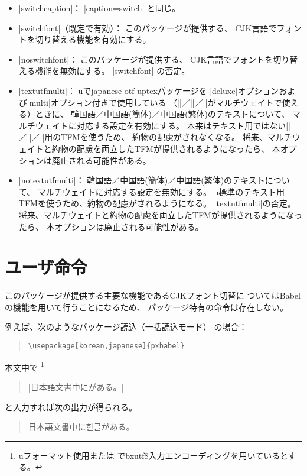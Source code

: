 \documentclass[a4paper,uplatex]{jsarticle}
\newcommand{\Pkg}[1]{\textsf{#1}}
\newcommand{\Means}{：\quad\inhibitglue}
\providecommand{\upTeX}{u\pTeX}
\providecommand{\upLaTeX}{u\pLaTeX}
\newcommand{\Kor}[1]{{\kanjishape{ko}\selectfont #1}}
\begin{document}
\begin{itemize}
\item |switchcaption|\Means
|caption=switch| と同じ。

\item |switchfont|（既定で有効）\Means
このパッケージが提供する、
CJK言語でフォントを切り替える機能を有効にする。

\item |noswitchfont|\Means
このパッケージが提供する、
CJK言語でフォントを切り替える機能を無効にする。
|switchfont| の否定。

\item |textutfmulti|\Means
\upTeX で\Pkg{japanese-otf-uptex}パッケージを
|deluxe|オプションおよび|multi|オプション付きで使用している
（|\UTFK|／|\UTFC|／|\UTFT|がマルチウェイトで使える）ときに、
韓国語／中国語(簡体)／中国語(繁体)のテキストについて、
マルチウェイトに対応する設定を有効にする。
本来はテキスト用ではない|\UTFK|／|\UTFC|／|\UTFT|用のTFMを使うため、
約物の配慮がされなくなる。
将来、マルチウェイトと約物の配慮を両立したTFMが提供されるようになったら、
本オプションは廃止される可能性がある。

\item |notextutfmulti|\Means
韓国語／中国語(簡体)／中国語(繁体)のテキストについて、
マルチウェイトに対応する設定を無効にする。
\upTeX 標準のテキスト用TFMを使うため、約物の配慮がされるようになる。
|textutfmulti|の否定。
将来、マルチウェイトと約物の配慮を両立したTFMが提供されるようになったら、
本オプションは廃止される可能性がある。
\end{itemize}

\section{ユーザ命令}

このパッケージが提供する主要な機能であるCJKフォント切替に
ついてはBabelの機能を用いて行うことになるため、
パッケージ特有の命令は存在しない。

例えば、次のようなパッケージ読込（一括読込モード）
の場合：
\begin{quote}\begin{verbatim}
\usepackage[korean,japanese]{pxbabel}
\end{verbatim}\end{quote}
本文中で
\footnote{{\upLaTeX}フォーマット使用または
{\pLaTeX}で\Pkg{bxutf8}入力エンコーディングを用いているとする。}
\begin{quote}
|日本語文書中に\foregnlanguage{korean}{|%
\textgt{\Kor{한글}}|}がある。|
\end{quote} 
と入力すれば次の出力が得られる。
\begin{quote}
日本語文書中に\Kor{한글}がある。
\end{quote} 
\end{document}
